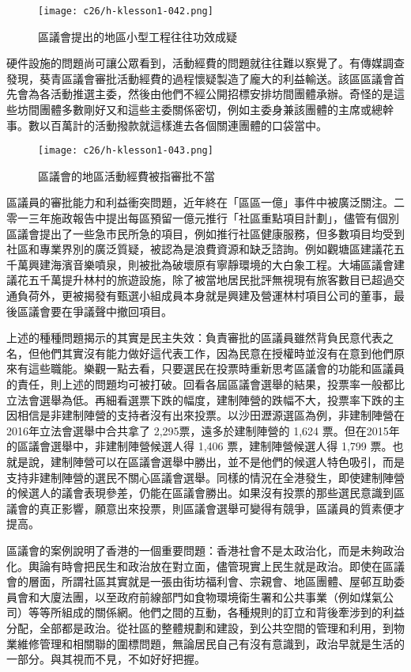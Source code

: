 \begin{figure}[htbp]
    \centering
    \texttt{[image: c26/h-klesson1-042.png]}
    \caption{區議會提出的地區小型工程往往功效成疑} 
\end{figure}

硬件設施的問題尚可讓公眾看到，活動經費的問題就往往難以察覺了。有傳媒調查發現，葵青區議會審批活動經費的過程懷疑製造了龐大的利益輸送。該區區議會首先會為各活動推選主委，然後由他們不經公開招標安排坊間團體承辦。奇怪的是這些坊間團體多數剛好又和這些主委關係密切，例如主委身兼該團體的主席或總幹事。數以百萬計的活動撥款就這樣進去各個關連團體的口袋當中。

\begin{figure}[htbp]
    \centering
    \texttt{[image: c26/h-klesson1-043.png]}
    \caption{區議會的地區活動經費被指審批不當} 
\end{figure}

區議員的審批能力和利益衝突問題，近年終在「區區一億」事件中被廣泛關注。二零一三年施政報告中提出每區預留一億元推行「社區重點項目計劃」，儘管有個別區議會提出了一些急市民所急的項目，例如推行社區健康服務，但多數項目均受到社區和專業界別的廣泛質疑，被認為是浪費資源和缺乏諮詢。例如觀塘區建議花五千萬興建海濱音樂噴泉，則被批為破壞原有寧靜環境的大白象工程。大埔區議會建議花五千萬提升林村的旅遊設施，除了被當地居民批評無視現有旅客數目已超過交通負荷外，更被揭發有甄選小組成員本身就是興建及營運林村項目公司的董事，最後區議會要在爭議聲中撤回項目。

上述的種種問題揭示的其實是民主失效：負責審批的區議員雖然背負民意代表之名，但他們其實沒有能力做好這代表工作，因為民意在授權時並沒有在意到他們原來有這些職能。樂觀一點去看，只要選民在投票時重新思考區議會的功能和區議員的責任，則上述的問題均可被打破。回看各屆區議會選舉的結果，投票率一般都比立法會選舉為低。再細看選票下跌的幅度，建制陣營的跌幅不大，投票率下跌的主因相信是非建制陣營的支持者沒有出來投票。以沙田瀝源選區為例，非建制陣營在2016年立法會選舉中合共拿了 2,295票，遠多於建制陣營的 1,624 票。但在2015年的區議會選舉中，非建制陣營候選人得 1,406 票，建制陣營候選人得 1,799 票。也就是說，建制陣營可以在區議會選舉中勝出，並不是他們的候選人特色吸引，而是支持非建制陣營的選民不關心區議會選舉。同樣的情況在全港發生，即使建制陣營的候選人的議會表現參差，仍能在區議會勝出。如果沒有投票的那些選民意識到區議會的真正影響，願意出來投票，則區議會選舉可變得有競爭，區議員的質素便才提高。

區議會的案例說明了香港的一個重要問題：香港社會不是太政治化，而是未夠政治化。輿論有時會把民生和政治放在對立面，儘管現實上民生就是政治。即使在區議會的層面，所謂社區其實就是一張由街坊福利會、宗親會、地區團體、屋邨互助委員會和大廈法團，以至政府前線部門如食物環境衛生署和公共事業（例如煤氣公司）等等所組成的關係網。他們之間的互動，各種規則的訂立和背後牽涉到的利益分配，全部都是政治。從社區的整體規劃和建設，到公共空間的管理和利用，到物業維修管理和相關聯的圍標問題，無論居民自己有沒有意識到，政治早就是生活的一部分。與其視而不見，不如好好把握。



